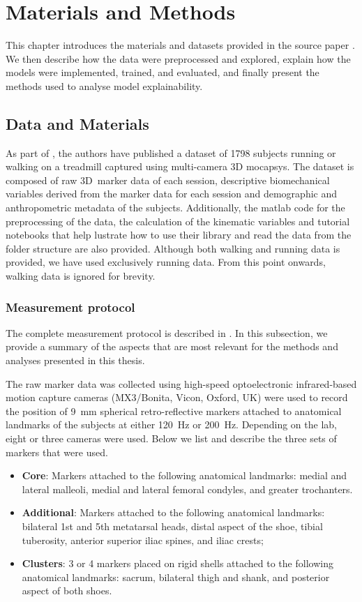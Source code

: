 \chapter{Materials and Methods}\label{chap:materials-methods}
This chapter introduces the materials and datasets provided in the source paper \citep{Ferber2024}. We then describe how the data were preprocessed and explored, explain how the models were implemented, trained, and evaluated, and finally present the methods used to analyse model explainability.

\section{Data and Materials}\label{sec:method-data-materials}
As part of \citet{Ferber2024}, the authors have published a dataset of 1798 \glspl{subject} running or walking on a treadmill captured using multi-camera 3D \gls{mocapsys}. The dataset is composed of raw 3D~marker data of each \gls{session}, descriptive biomechanical variables derived from the marker data for each session and demographic and anthropometric metadata of the subjects. Additionally, the matlab code for the preprocessing of the data, the calculation of the kinematic variables and tutorial notebooks that help lustrate how to use their library and read the data from the folder structure are also provided. Although both walking and running data is provided, we have used exclusively running data. From this point onwards, walking data is ignored for brevity.

\subsection{Measurement protocol}\label{subsec:measurement-protocol}
The complete measurement protocol is described in \citet{Ferber2024}. In this subsection, we provide a summary of the aspects that are most relevant for the methods and analyses presented in this thesis.

The raw marker data was collected using high-speed optoelectronic infrared-based motion capture cameras (MX3/Bonita, Vicon, Oxford, UK) were used to record the position of 9~mm spherical retro-reflective markers attached to anatomical landmarks of the subjects at either 120~Hz or 200~Hz. Depending on the lab, eight or three cameras were used. Below we list and describe the three sets of markers that were used.
\begin{itemize}
    \item \textbf{Core}: Markers attached to the following anatomical landmarks: medial and lateral malleoli, medial and lateral femoral condyles, and greater trochanters.
    \item \textbf{Additional}: Markers attached to the following anatomical landmarks: bilateral 1st and 5th metatarsal heads, distal aspect of the shoe, tibial tuberosity, anterior superior iliac spines, and iliac crests;
    \item \textbf{Clusters}: 3 or 4 markers placed on rigid shells attached to the following anatomical landmarks: sacrum, bilateral thigh and shank, and posterior aspect of both shoes.
\end{itemize}

